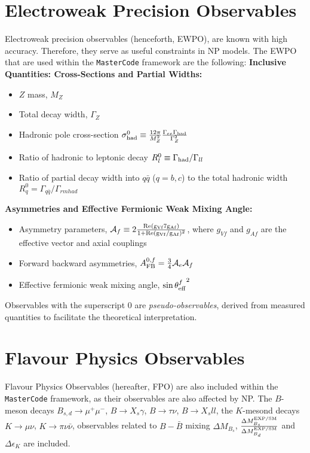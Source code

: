 \section{Electroweak Precision Observables}
Electroweak precision observables (henceforth, EWPO), are known with high accuracy. Therefore, they serve as useful constraints in NP models. The EWPO that are used within the \texttt{MasterCode} framework are the following:
\textbf{Inclusive Quantities: Cross-Sections and Partial Widths:}
\begin{itemize}
\item $Z$ mass, $M_Z$
\item Total decay width, $\Gamma_Z$
\item Hadronic pole cross-section $\sigma_{\rm had}^0 \equiv \frac{12\pi}{M_Z^2}\frac{\Gamma_{ee}\Gamma_{\rm had}}{\Gamma_Z^2}$
\item Ratio of hadronic to leptonic decay $R_l^0 \equiv \Gamma_{\rm had}/\Gamma_{ll}$
\item Ratio of partial decay width into $q\bar{q}$ ($q = b,c$) to the total hadronic width $R_q^0 = \Gamma_{q\bar{q}}/\Gamma_{rm had}$ 
\end{itemize}
\textbf{Asymmetries and Effective Fermionic Weak Mixing Angle:}
\begin{itemize}
\item Asymmetry parameters, $\mathcal{A}_f \equiv 2\frac{\rm Re(g_{Vf}7g_{Af})}{1 + \rm Re(g_{Vf}/g_{Af})^2}$, where $g_{Vf}$ and $g_{Af}$ are the effective vector and axial couplings
\item Forward backward asymmetries, $A_{\rm FB}^{0,f} = \frac{3}{4}\mathcal{A}_e\mathcal{A}_f$
\item Effective fermionic weak mixing angle, $\sin{\theta_{\rm eff}^f}^2$
\end{itemize}
Observables with the superscript 0 are \textit{pseudo-observables}, derived from measured quantities to facilitate the theoretical interpretation. 

\section{Flavour Physics Observables}
Flavour Physics Observables (hereafter, FPO) are also included within the \texttt{MasterCode} framework, as their observables are also affected by NP. The $B$-meson decays $B_{s,d} \rightarrow \mu^+ \mu^-$, $B \rightarrow X_s \gamma$, $B \rightarrow \tau \nu$, $B \rightarrow X_s ll$, the $K$-mesond decays $K \rightarrow \mu\nu$, $K \rightarrow \pi \nu \bar{\nu}$, observables related to $B - \bar{B}$ mixing $\Delta M_{B_s}$, $\frac{\Delta M_{B_s}^{\rm EXP/SM}}{\Delta M_{B_d}^{\rm EXP/SM}}$ and $\Delta\epsilon_K$ are included. 

